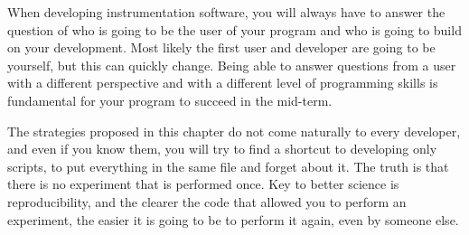 When developing instrumentation software, you will always have to answer
the question of who is going to be the user of your program and who is
going to build on your development. Most likely the first user and
developer are going to be yourself, but this can quickly change. Being
able to answer questions from a user with a different perspective and
with a different level of programming skills is fundamental for your
program to succeed in the mid-term.

The strategies proposed in this chapter do not come naturally to every
developer, and even if you know them, you will try to find a shortcut to
developing only scripts, to put everything in the same file and forget
about it. The truth is that there is no experiment that is performed
once. Key to better science is reproducibility, and the clearer the code
that allowed you to perform an experiment, the easier it is going to be
to perform it again, even by someone else.

